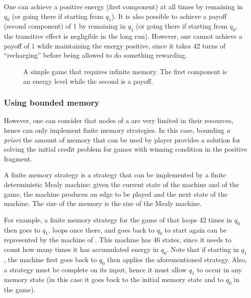 One can achieve a positive energy (first component) at all times by remaining in $q_0$ (or going there if starting from $q_1$).
It is also possible to achieve a payoff (second component) of $1$ by remaining in $q_1$ (or going there if starting from $q_0$, the transitive effect is negligible in the long run).
However, one cannot achieve a payoff of $1$ while maintaining the energy positive, since it takes 42 turns of ``recharging'' before being allowed to do something rewarding.

\begin{figure}
\centering
{}
\caption{A simple game that requires infinite memory. The first component is an energy level while the second is a payoff.}
\label{tj:fig:infmemoryneeded}
\end{figure}

\subsubsection{Using bounded memory}

However, one can consider that nodes of a \wsn are very limited in their resources, hence can only implement finite memory strategies.
In this case, bounding \emph{a priori} the amount of memory that can be used by player provides a solution for solving the initial credit problem for games with winning condition in the positive fragment.

A finite memory strategy is a strategy that can be implemented by a finite deterministic Mealy machine: given the current state of the machine and of the game, the machine produces an edge to be played and the next state of the machine.
The size of the memory is the size of the Mealy machine.

For example, a finite memory strategy for the game of  that loops 42 times in $q_0$ then goes to $q_1$, loops once there, and goes back to $q_0$ to start again can be represented by the machine of .
This machine has 46 states, since it needs to count how many times it has accumulated energy in $q_0$.
Note that if starting in $q_1$, the machine first goes back to $q_0$ then applies the aforementioned strategy.
Also, a strategy must be complete on its input, hence it must allow $q_1$ to occur in any memory state (in this case it goes back to the initial memory state and to $q_0$ in the game).

